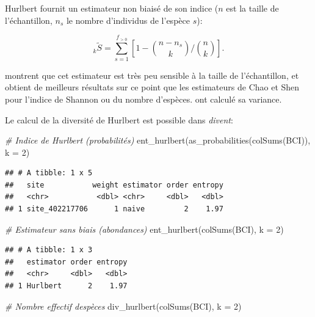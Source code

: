 \documentclass[
  11pt,
  american,
  a4paper,
  extrafontsizes,onecolumn,openright
  ]{memoir}
\newenvironment{Shaded}{\begin{snugshade}}{\end{snugshade}}
\newcommand{\AttributeTok}[1]{\textcolor[rgb]{0.77,0.63,0.00}{#1}}
\newcommand{\CommentTok}[1]{\textcolor[rgb]{0.56,0.35,0.01}{\textit{#1}}}
\newcommand{\DecValTok}[1]{\textcolor[rgb]{0.00,0.00,0.81}{#1}}
\newcommand{\FunctionTok}[1]{\textcolor[rgb]{0.00,0.00,0.00}{#1}}
\newcommand{\NormalTok}[1]{#1}
\begin{document}
Hurlbert fournit un estimateur non biaisé de son indice (\(n\) est la taille de l'échantillon, \(n_s\) le nombre d'individus de l'espèce \(s\)):

\begin{equation}
  \label{eq:EstHurlbert}
  _k{\tilde{S}}
  = \sum_{s=1}^{f_{>0}}{\left[ 1-{\binom{n - n_s}{k}}/{\binom{n}{k}} \right]}.
\end{equation}

\textcite{Dauby2012} montrent que cet estimateur est très peu sensible à la taille de l'échantillon, et obtient de meilleurs résultats sur ce point que les estimateurs de Chao et Shen pour l'indice de Shannon ou du nombre d'espèces.
\textcite{Smith1977} ont calculé sa variance.

Le calcul de la diversité de Hurlbert est possible dans \emph{divent}:

\scriptsize

\begin{Shaded}
\begin{Highlighting}[]
\CommentTok{\# Indice de Hurlbert (probabilités)}
\FunctionTok{ent\_hurlbert}\NormalTok{(}\FunctionTok{as\_probabilities}\NormalTok{(}\FunctionTok{colSums}\NormalTok{(BCI)), }\AttributeTok{k =} \DecValTok{2}\NormalTok{)}
\end{Highlighting}
\end{Shaded}

\begin{verbatim}
## # A tibble: 1 x 5
##   site           weight estimator order entropy
##   <chr>           <dbl> <chr>     <dbl>   <dbl>
## 1 site_402217706      1 naive         2    1.97
\end{verbatim}

\begin{Shaded}
\begin{Highlighting}[]
\CommentTok{\# Estimateur sans biais (abondances)}
\FunctionTok{ent\_hurlbert}\NormalTok{(}\FunctionTok{colSums}\NormalTok{(BCI), }\AttributeTok{k =} \DecValTok{2}\NormalTok{)}
\end{Highlighting}
\end{Shaded}

\begin{verbatim}
## # A tibble: 1 x 3
##   estimator order entropy
##   <chr>     <dbl>   <dbl>
## 1 Hurlbert      2    1.97
\end{verbatim}

\begin{Shaded}
\begin{Highlighting}[]
\CommentTok{\# Nombre effectif d\textquotesingle{}espèces}
\FunctionTok{div\_hurlbert}\NormalTok{(}\FunctionTok{colSums}\NormalTok{(BCI), }\AttributeTok{k =} \DecValTok{2}\NormalTok{)}
\end{Highlighting}
\end{Shaded}
\end{document}
